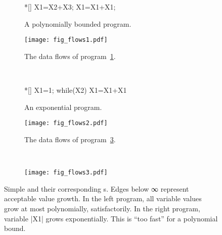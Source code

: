 \begin{figure}[H]
\centering
\begin{subfigure}{.45\textwidth}
\centering\begin{minipage}{.7\textwidth}
\begin{implisting}*[]
X1=X2+X3;
X1=X1+X1;
\end{implisting}
\end{minipage}
\caption{A polynomially bounded program.}\label{lst:simple-dfg-1}
\end{subfigure}\hfill
\begin{subfigure}{.45\textwidth}
\begin{center}
\texttt{[image: fig\_flows1.pdf]}
\end{center}
\caption{The data flows of program~\ref{lst:simple-dfg-1}.}%
\label{fig:simple-dfg-1}
\end{subfigure}\\[1em]
\begin{subfigure}{.45\textwidth}
\centering\begin{minipage}{.7\textwidth}
\begin{implisting}*[]
X1=1;
while(X2)
  X1=X1+X1
\end{implisting}
\end{minipage}
\caption{An exponential program.}\label{lst:simple-dfg-2}
\end{subfigure}\hfill
\begin{subfigure}{.45\textwidth}
\begin{center}
\texttt{[image: fig\_flows2.pdf]}
\end{center}
\caption{The data flows of program~\ref{lst:simple-dfg-2}.}%
\label{fig:simple-dfg-2}
\end{subfigure}\\[1em]
\begin{subfigure}{\textwidth}
\centering\texttt{[image: fig\_flows3.pdf]}
\end{subfigure}
\caption[Simple imperative programs and their corresponding data flow graphs]{
Simple  and their corresponding s.
Edges below ∞ represent acceptable value growth. In the left
program, all variable values grow at most polynomially, \ie satisfactorily. In
the right program, variable \pr|X1| grows exponentially. This is \enquote{too
fast} for a polynomial bound.
}\label{fig:dfg-ex}
\end{figure}

